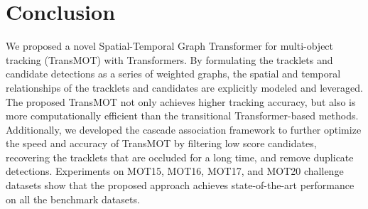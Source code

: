 \documentclass[10pt,twocolumn,letterpaper]{article}
\begin{document}
\section{Conclusion}
We proposed a novel Spatial-Temporal Graph Transformer for multi-object tracking (TransMOT) with Transformers. 
By formulating the tracklets and candidate detections as a series of weighted graphs, the spatial and temporal relationships of the tracklets and candidates are explicitly modeled and leveraged. The proposed TransMOT not only achieves higher tracking accuracy, but also is more computationally efficient than the transitional Transformer-based methods.
Additionally, we developed the cascade association framework to further optimize the speed and accuracy of TransMOT by filtering low score candidates, recovering the tracklets that are occluded for a long time, and remove duplicate detections. Experiments on MOT15, MOT16, MOT17, and MOT20 challenge datasets show that the proposed approach achieves state-of-the-art performance on all the benchmark datasets.



{\small


}
\end{document}
